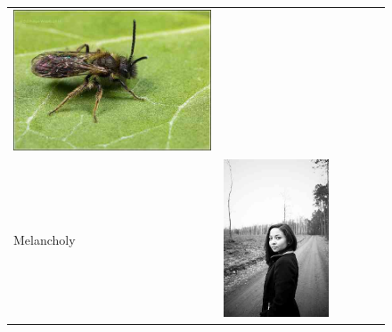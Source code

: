 \begin{figure}
\begin{tabular}{m{.01\linewidth} m{.16\linewidth} m{.16\linewidth} m{.16\linewidth} m{.16\linewidth} m{.16\linewidth}}
    \includegraphics[width=\linewidth]{../style/figures/flickr_on_flickr/pred_style_Macro/4.jpg} \\
    \begin{turn}{90}{Melancholy}\end{turn} &
    \includegraphics[width=\linewidth]{../style/figures/flickr_on_flickr/pred_style_Melancholy/0.jpg} &

\end{tabular}
\end{figure}
